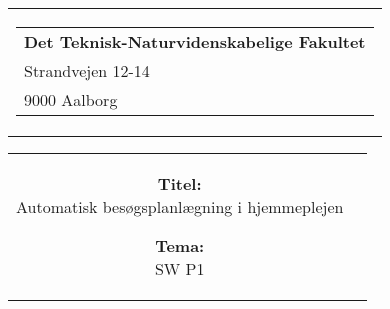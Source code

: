 
% 
\thispagestyle{empty}
{\samepage 
\begin{tabular}{r}
	\parbox{\textwidth}{  
	\hfill \parbox{7cm}{\begin{tabular}{l} %
		{\small \textbf{Det Teknisk-Naturvidenskabelige Fakultet}}\\
		{\small Strandvejen 12-14} \\
		{\small 9000 Aalborg}\\
	\end{tabular}}
	}
\end{tabular}

\begin{tabular}{cc}
	\parbox{8cm}{
	\begin{description}
		\item { \textbf{Titel:}}\\ 
			Automatisk besøgsplanlægning i hjemmeplejen\\
    		\item { \textbf{Tema:}}\\ 
			SW P1\\
	\end{description}
	
}
\end{tabular}}
